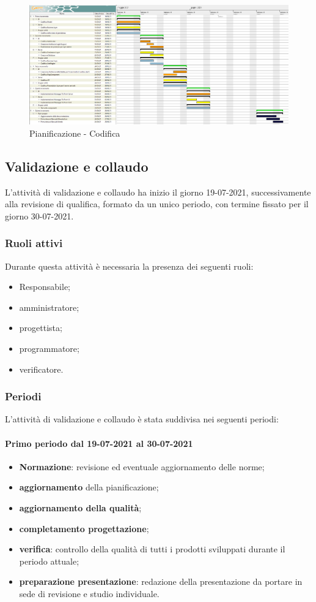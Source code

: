 \newpage
\begin{landscape}
	\begin{figure}[h!]
		\includegraphics[width=24cm]{images/6_incrementi}
		\caption{Pianificazione - Codifica }
	\end{figure}
\end{landscape}

\clearpage
\subsection{Validazione e collaudo}
L'attività di validazione e collaudo ha inizio il giorno 19-07-2021, successivamente alla revisione di qualifica, formato da un unico periodo, con termine fissato per il giorno 30-07-2021.

\subsubsection{Ruoli attivi}
Durante questa attività è necessaria la presenza dei seguenti ruoli:
\begin{itemize}
	\item Responsabile;
	\item amministratore;
	\item progettista;
	\item programmatore;
	\item verificatore.
\end{itemize}
\subsubsection{Periodi}
L'attività di validazione e collaudo è stata suddivisa nei seguenti periodi:
\paragraph{Primo periodo dal 19-07-2021 al 30-07-2021}
\begin{itemize}
	\item \textbf{Normazione}: revisione ed eventuale aggiornamento delle norme;
	\item \textbf{aggiornamento} della pianificazione;
	\item \textbf{aggiornamento della qualità};
	\item \textbf{completamento progettazione};
	\item \textbf{verifica}: controllo della qualità di tutti i prodotti sviluppati durante il periodo attuale;
	\item \textbf{preparazione presentazione}: redazione della presentazione da portare in sede di revisione e
	studio individuale.
\end{itemize}